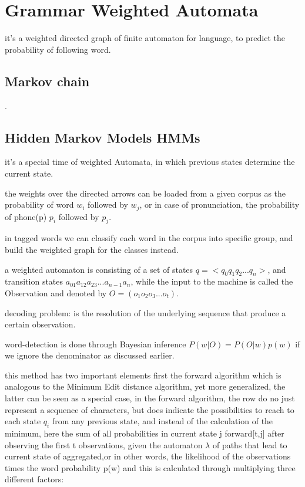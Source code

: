 \documentclass[4apaper,12pt]{book}
\begin{document}
\section {Grammar Weighted Automata}
\begin{description}
\item it's a weighted directed graph of finite automaton for language, to predict the probability of following word.
  \subsection{Markov chain}
    \item .
  \subsection{Hidden Markov Models HMMs}
\item it's a special time of weighted Automata, in which previous states determine the current state.
\item the weights over the directed arrows can be loaded from a given corpus as the probability of word $w_i$ followed by $w_j$, or in case of pronunciation, the probability of phone(p) $p_i$ followed by $p_j$.
\item in tagged words we can classify each word in the corpus into specific group, and build the weighted graph for the classes instead.
\item a weighted automaton is consisting of a set of states $q=<q_0q_1q_2...q_n>$, and transition states $a_{01}a_{12}a_{23}...a_{n-1}a_n$, while the input to the machine is called the Observation and denoted by $O=(o_1o_2o_3...o_t)$.
\item decoding problem: is the resolution of the underlying sequence that produce a certain observation.
\item word-detection is done through Bayesian inference $P(w|O)=P(O|w)p(w)$ if we ignore the denominator as discussed earlier.
\item this method has two important elements first the forward algorithm which is analogous to the Minimum Edit distance algorithm, yet more generalized, the latter can be seen as a special case, in the forward algorithm, the row do no just represent a sequence of characters, but does indicate the possibilities to reach to each state $q_i$ from any previous state, and instead of the calculation of the minimum, here the sum of all probabilities in current state j forward[t,j] after observing the first t observations, given the automaton $\lambda$ of paths that lead to current state of aggregated,or in other words, the likelihood of the observations times the word probability p(w) and this is calculated through multiplying three different factors: \begin{enumerate}

\end{enumerate}
\end{description}
\end{document}
